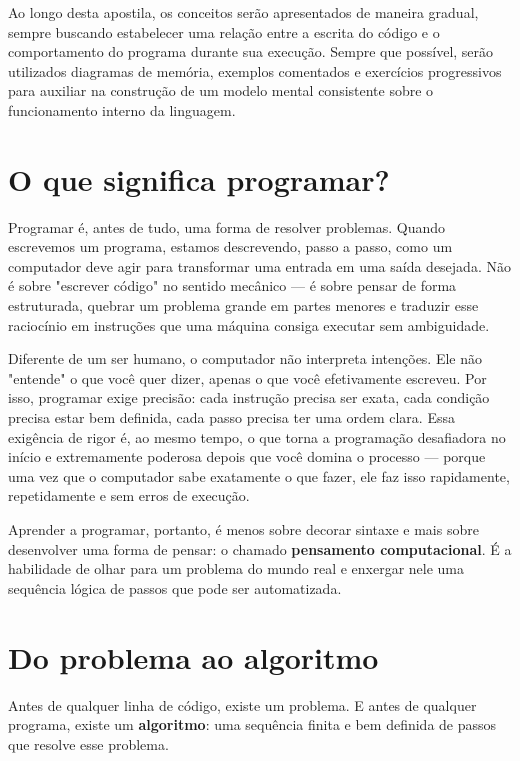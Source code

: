 \documentclass[12pt,a4paper,oneside]{extreport}
\begin{document}
Ao longo desta apostila, os conceitos serão apresentados de maneira gradual, sempre buscando estabelecer uma relação entre a escrita do código e o comportamento do programa durante sua execução. Sempre que possível, serão utilizados diagramas de memória, exemplos comentados e exercícios progressivos para auxiliar na construção de um modelo mental consistente sobre o funcionamento interno da linguagem.


\section{O que significa programar?}

Programar é, antes de tudo, uma forma de resolver problemas. Quando escrevemos um programa, estamos descrevendo, passo a passo, como um computador deve agir para transformar uma entrada em uma saída desejada. Não é sobre "escrever código" no sentido mecânico — é sobre pensar de forma estruturada, quebrar um problema grande em partes menores e traduzir esse raciocínio em instruções que uma máquina consiga executar sem ambiguidade.

Diferente de um ser humano, o computador não interpreta intenções. Ele não "entende" o que você quer dizer, apenas o que você efetivamente escreveu. Por isso, programar exige precisão: cada instrução precisa ser exata, cada condição precisa estar bem definida, cada passo precisa ter uma ordem clara. Essa exigência de rigor é, ao mesmo tempo, o que torna a programação desafiadora no início e extremamente poderosa depois que você domina o processo — porque uma vez que o computador sabe exatamente o que fazer, ele faz isso rapidamente, repetidamente e sem erros de execução.

Aprender a programar, portanto, é menos sobre decorar sintaxe e mais sobre desenvolver uma forma de pensar: o chamado \textbf{pensamento computacional}. É a habilidade de olhar para um problema do mundo real e enxergar nele uma sequência lógica de passos que pode ser automatizada.



\section{Do problema ao algoritmo}

Antes de qualquer linha de código, existe um problema. E antes de qualquer programa, existe um \textbf{algoritmo}: uma sequência finita e bem definida de passos que resolve esse problema.
\end{document}
